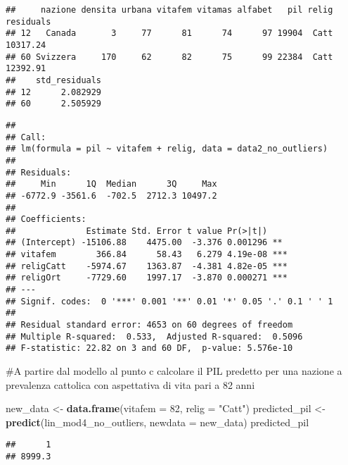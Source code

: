 \documentclass[
]{article}
\newenvironment{Shaded}{\begin{snugshade}}{\end{snugshade}}
\newcommand{\AttributeTok}[1]{\textcolor[rgb]{0.13,0.29,0.53}{#1}}
\newcommand{\CommentTok}[1]{\textcolor[rgb]{0.56,0.35,0.01}{\textit{#1}}}
\newcommand{\DecValTok}[1]{\textcolor[rgb]{0.00,0.00,0.81}{#1}}
\newcommand{\FunctionTok}[1]{\textcolor[rgb]{0.13,0.29,0.53}{\textbf{#1}}}
\newcommand{\NormalTok}[1]{#1}
\newcommand{\OtherTok}[1]{\textcolor[rgb]{0.56,0.35,0.01}{#1}}
\newcommand{\SpecialCharTok}[1]{\textcolor[rgb]{0.81,0.36,0.00}{\textbf{#1}}}
\newcommand{\StringTok}[1]{\textcolor[rgb]{0.31,0.60,0.02}{#1}}
\begin{document}
\begin{verbatim}
##     nazione densita urbana vitafem vitamas alfabet   pil relig residuals
## 12   Canada       3     77      81      74      97 19904  Catt  10317.24
## 60 Svizzera     170     62      82      75      99 22384  Catt  12392.91
##    std_residuals
## 12      2.082929
## 60      2.505929
\end{verbatim}

\begin{Shaded}
\end{Shaded}

\begin{verbatim}
## 
## Call:
## lm(formula = pil ~ vitafem + relig, data = data2_no_outliers)
## 
## Residuals:
##     Min      1Q  Median      3Q     Max 
## -6772.9 -3561.6  -702.5  2712.3 10497.2 
## 
## Coefficients:
##              Estimate Std. Error t value Pr(>|t|)    
## (Intercept) -15106.88    4475.00  -3.376 0.001296 ** 
## vitafem        366.84      58.43   6.279 4.19e-08 ***
## religCatt    -5974.67    1363.87  -4.381 4.82e-05 ***
## religOrt     -7729.60    1997.17  -3.870 0.000271 ***
## ---
## Signif. codes:  0 '***' 0.001 '**' 0.01 '*' 0.05 '.' 0.1 ' ' 1
## 
## Residual standard error: 4653 on 60 degrees of freedom
## Multiple R-squared:  0.533,  Adjusted R-squared:  0.5096 
## F-statistic: 22.82 on 3 and 60 DF,  p-value: 5.576e-10
\end{verbatim}

\#A partire dal modello al punto c calcolare il PIL predetto per una
nazione a prevalenza cattolica con aspettativa di vita pari a 82 anni

\begin{Shaded}
\begin{Highlighting}[]
\NormalTok{new\_data }\OtherTok{\textless{}{-}} \FunctionTok{data.frame}\NormalTok{(}\AttributeTok{vitafem =} \DecValTok{82}\NormalTok{, }\AttributeTok{relig =} \StringTok{"Catt"}\NormalTok{)}
\NormalTok{predicted\_pil }\OtherTok{\textless{}{-}} \FunctionTok{predict}\NormalTok{(lin\_mod4\_no\_outliers, }\AttributeTok{newdata =}\NormalTok{ new\_data)}
\NormalTok{predicted\_pil}
\end{Highlighting}
\end{Shaded}

\begin{verbatim}
##      1 
## 8999.3
\end{verbatim}
\end{document}
